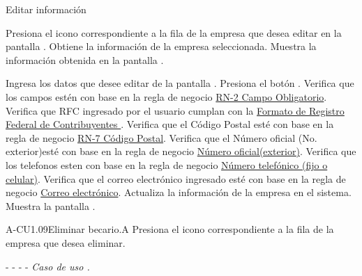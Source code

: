 	\begin{UCtrayectoria}{Editar información }

	     \UCpaso[\UCactor] Presiona el icono \faEdit correspondiente a la fila de la empresa que desea editar en la pantalla .
		\UCpaso[\UCsist] Obtiene la información de la empresa seleccionada.
		\UCpaso[\UCsist] Muestra la información obtenida en la pantalla . 

		\UCpaso[\UCactor] Ingresa los datos que desee editar de la pantalla .
		\UCpaso[\UCactor] Presiona el botón . 
		\UCpaso[\UCsist] Verifica que los campos estén con base en la regla de negocio \hyperlink{RN2}{RN-2 Campo Obligatorio}. 
		\UCpaso[\UCsist] Verifica que RFC ingresado por el usuario cumplan con la \hyperlink{RN8}{Formato de Registro Federal de Contribuyentes } . 
		\UCpaso[\UCsist] Verifica que el Código Postal esté con base en la regla de negocio \hyperlink{RN7}{RN-7 C\'odigo Postal}. 
		\UCpaso[\UCsist] Verifica que el Número oficial (No. exterior)esté con base en la regla de negocio \hyperlink{RN12}{Número oficial(exterior)}. 
		\UCpaso[\UCsist] Verifica que los telefonos esten con base en la regla de negocio \hyperlink{RN10}{Número telefónico (fijo o celular)}. 
		\UCpaso[\UCsist] Verifica que el correo electrónico ingresado esté con base en la regla de negocio \hyperlink{RN13}{Correo electrónico}. 
        \UCpaso[\UCsist] Actualiza la información de la empresa en el sistema.
	    \UCpaso[\UCsist] Muestra la pantalla .
	
	\end{UCtrayectoria}
	

	

	
	

\begin{UCtrayectoriaA}{A-CU1.09}{Eliminar becario.}{A}
	     \UCpaso[\UCactor]Presiona el icono \faTrashO correspondiente a la fila de la empresa que desea eliminar.
	     
	    \item[- -] - - {\em Caso de uso .}
	\end{UCtrayectoriaA}

